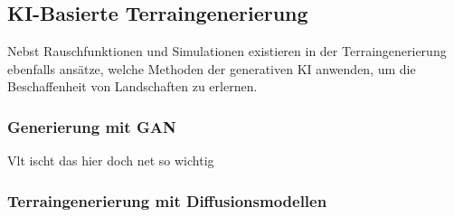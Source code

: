\subsection{KI-Basierte Terraingenerierung}

Nebst Rauschfunktionen und Simulationen existieren in der Terraingenerierung ebenfalls ansätze, welche Methoden der generativen KI anwenden, um die Beschaffenheit von Landschaften zu erlernen.

\subsubsection{Generierung mit GAN}

Vlt ischt das hier doch net so wichtig


\subsubsection{Terraingenerierung mit Diffusionsmodellen}

